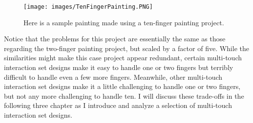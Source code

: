 \begin{figure}
\centering
\texttt{[image: images/TenFingerPainting.PNG]}
\caption[Ten-Finger Painting Screenshot]
{Here is a sample painting made using a ten-finger painting project.}
\label{TenFingerPainting}
\end{figure}

Notice that the problems for this project are essentially the same as those regarding the two-finger painting project, but scaled by a factor of five. While the similarities might make this case project appear redundant, certain multi-touch interaction set designs make it easy to handle one or two fingers but terribly difficult to handle even a few more fingers. Meanwhile, other multi-touch interaction set designs make it a little challenging to handle one or two fingers, but not any more challenging to handle ten. I will discuss these trade-offs in the following three chapter as I introduce and analyze a selection of multi-touch interaction set designs.
